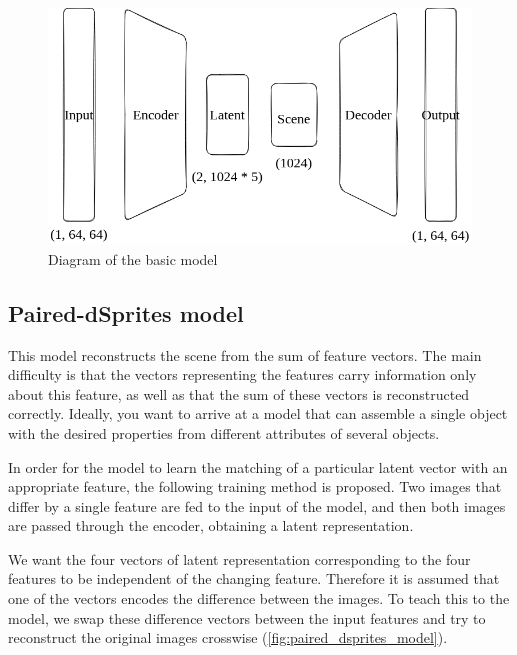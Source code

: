 \documentclass{article}
\begin{document}
    \begin{figure}
        \centering
        \includegraphics[width=0.7\linewidth]{img/model/basic_model}
        \caption{Diagram of the basic model}
        \label{fig:basic_model}

    \end{figure}

    \subsection{Paired-dSprites model}
    This model reconstructs the scene from the sum of feature vectors.
    The main difficulty is that the vectors representing the features carry
    information only about this feature, as well as that the sum of these
    vectors is reconstructed correctly. Ideally, you want to arrive at a
    model that can assemble a single object with the desired properties
    from different attributes of several objects.

    In order for the model to learn the matching of a particular latent vector
    with an appropriate feature, the following training method is proposed.
    Two images that differ by a single feature are fed to the input of the
    model, and then both images are passed through the encoder, obtaining
    a latent representation.

    We want the four vectors of latent representation corresponding to the
    four features to be independent of the changing feature. Therefore it
    is assumed that one of the vectors encodes the difference between the
    images. To teach this to the model, we swap these difference vectors
    between the input features and try to reconstruct the original images
    crosswise (\autoref{fig:paired_dsprites_model}).
\end{document}
